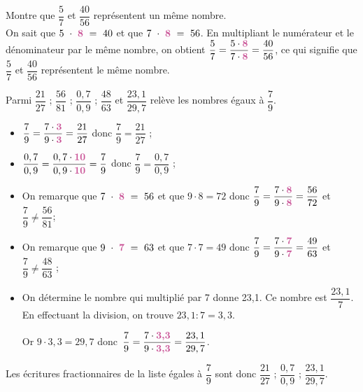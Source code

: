\begin{methode*1}

\begin{exemple*1}
Montre que $\dfrac{5}{7}$ et $\dfrac{40}{56}$ représentent un même nombre. \\[1em]
On sait que $5 \cdot \text{\textbf{\textcolor{C2}{8}}} = 40$ et que $7 \cdot \text{\textbf{\textcolor{C2}{8}}} = 56$. 
En multipliant le numérateur et le dénominateur par le même nombre, on obtient $\dfrac{5}{7} = \dfrac{5 \cdot \text{\textbf{\textcolor{C2}{8}}}}{7 \cdot \text{\textbf{\textcolor{C2}{8}}}} = \dfrac{40}{56}$, ce qui signifie que $\dfrac{5}{7}$ et $\dfrac{40}{56}$ représentent le même nombre.
 \end{exemple*1}
 
 \begin{exemple*1}
Parmi  $\dfrac{21}{27}$ ; $\dfrac{56}{81}$ ; $\dfrac{0,7}{0,9}$ ; $\dfrac{48}{63}$ et $\dfrac{23,1}{29,7}$ relève les nombres égaux à $\dfrac{7}{9}$. \\[1em]
\begin{itemize}
 \item $\dfrac{7}{9} = \dfrac{7 \cdot \text{\textbf{\textcolor{C2}{3}}}}{9 \cdot \text{\textbf{\textcolor{C2}{3}}}} = \dfrac{21}{27}$ donc $\dfrac{7}{9} = \dfrac{21}{27}$ ;
\vspace{0.3cm}
\item $\dfrac{0,7}{0,9} = \dfrac{0,7 \cdot \text{\textbf{\textcolor{C2}{10}}}}{0,9 \cdot \text{\textbf{\textcolor{C2}{10}}}} = \dfrac{7}{9}$ donc $\dfrac{7}{9} = \dfrac{0,7}{0,9}$ ;
  \item On remarque que $7 \cdot \text{\textbf{\textcolor{C2}{8}}} = 56$ et que $9 \cdot 8 = 72$ donc $\dfrac{7}{9} = \dfrac{7 \cdot \text{\textbf{\textcolor{C2}{8}}}}{9 \cdot \text{\textbf{\textcolor{C2}{8}}}} = \dfrac{56}{72}$ et $\dfrac{7}{9} \neq \dfrac{56}{81}$;
  \item On remarque que $9 \cdot \text{\textbf{\textcolor{C2}{7}}} = 63$ et que $7 \cdot 7 = 49$ donc $\dfrac{7}{9} = \dfrac{7 \cdot \text{\textbf{\textcolor{C2}{7}}}}{9 \cdot \text{\textbf{\textcolor{C2}{7}}}} = \dfrac{49}{63}$ et $\dfrac{7}{9} \neq \dfrac{48}{63}$ ; 
 \vspace{0.3cm}
  \item On détermine le nombre qui multiplié par 7 donne 23,1. Ce nombre est $\dfrac{23,1}{7}$. En effectuant la division, on trouve $23,1 : 7 = 3,3$.

Or $9 \cdot 3,3 = 29,7$ donc $\dfrac{7}{9} = \dfrac{7 \cdot \text{\textbf{\textcolor{C2}{3,3}}}}{9 \cdot \text{\textbf{\textcolor{C2}{3,3}}}} = \dfrac{23,1}{29,7}$.
 \end{itemize}
Les écritures fractionnaires de la liste égales à $\dfrac{7}{9}$ sont donc $\dfrac{21}{27}$ ; $\dfrac{0,7}{0,9}$ ; $\dfrac{23,1}{29,7}$.
 \end{exemple*1}
 

\end{methode*1}
